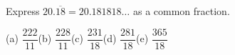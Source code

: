 Express $20.\overline{18}=20.181818\ldots$ as a common fraction.

(a) $\dfrac{222}{11}$\quad (b) $\dfrac{228}{11}$\quad (c) $\dfrac{231}{18}$\quad (d) $\dfrac{281}{18}$\quad (e) $\dfrac{365}{18}$
